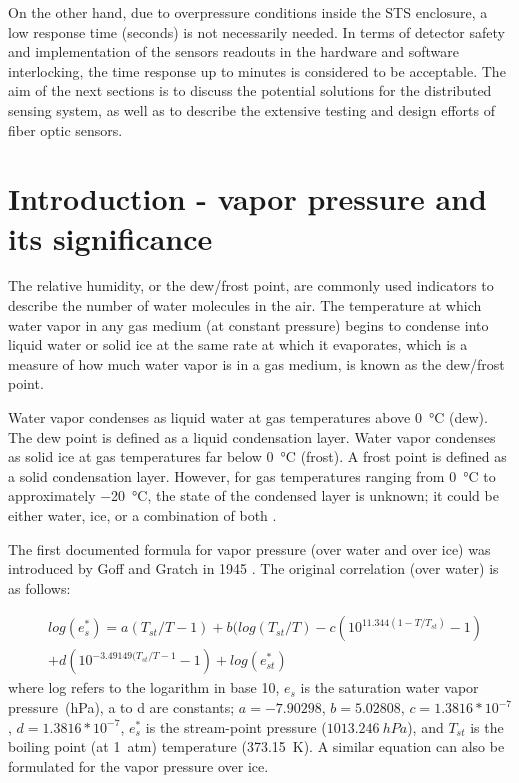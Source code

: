 On the other hand, due to overpressure conditions inside the \gls{STS} enclosure, a low response time (seconds) is not necessarily needed. In terms of detector safety and implementation of the sensors readouts in the hardware and software interlocking, the time response up to minutes is considered to be acceptable. The aim of the next sections is to discuss the potential solutions for the distributed sensing system, as well as to describe the extensive testing and design efforts of fiber optic sensors. 

\section{Introduction - vapor pressure and its significance}

The relative humidity, or the dew/frost point, are commonly used indicators to describe the number of water molecules in the air. The temperature at which water vapor in any gas medium (at constant pressure) begins to condense into liquid water or solid ice at the same rate at which it evaporates, which is a measure of how much water vapor is in a gas medium, is known as the dew/frost point.

Water vapor condenses as liquid water at gas temperatures above \SI{0}{\celsius} (dew). The dew point is defined as a liquid condensation layer. Water vapor condenses as solid ice at gas temperatures far below \SI{0}{\celsius} (frost). A frost point is defined as a solid condensation layer. However, for gas temperatures ranging from \SI{0}{\celsius} to approximately \SI{-20}{\celsius}, the state of the condensed layer is unknown; it could be either water, ice, or a combination of both \cite{nie_dewpoint}. 


The first documented formula for vapor pressure (over water and over ice) was introduced by Goff and Gratch in 1945 \cite{goff_gratch}. The original correlation (over water) is as follows:

\begin{equation}
\label{gratch}
\begin{split}
    &log({e}^{*}_{s}) = a(T_{st}/T - 1) + b(log(T_{st}/T) - c(10^{11.344(1-T/T_{st})} - 1) \\
    &+ d(10^{-3.49149(T_{st}/T - 1} -1) + log(e^{*}_{st})
\end{split}
\end{equation}
where log refers to the logarithm in base 10, $e_{s}$ is the saturation water vapor pressure~(hPa), a to d are constants; $a = - 7.90298$, $b=5.02808$, $c=1.3816*10^{-7}$, $d=1.3816*10^{-7}$, $e^{*}_{s}$ is the stream-point pressure ($1013.246~hPa$), and $T_{st}$ is the boiling point (at 1~atm) temperature (373.15~K). A similar equation can also be formulated for the vapor pressure over ice. 

